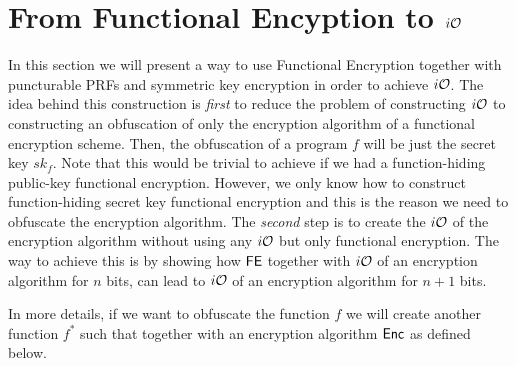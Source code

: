 \section{From Functional Encyption to $i\mathcal{O}$}

In this section we will present a way to use Functional Encryption together with puncturable PRFs and symmetric key encryption in order to achieve $i\mathcal{O}$. The idea behind this construction is \emph{first} to reduce the problem of constructing $i\mathcal{O}$ to constructing an obfuscation of only the encryption algorithm of a functional encryption scheme. Then, the obfuscation of a program $f$ will be just the secret key $sk_f$. Note that this would be trivial to achieve if we had a function-hiding public-key functional encryption. However, we only know how to construct function-hiding secret key functional encryption and this is the reason we need to obfuscate the encryption algorithm. The \emph{second} step is to create the $i\mathcal{O}$ of the encryption algorithm without using any $i\mathcal{O}$ but only functional encryption. The way to achieve this is by showing how $\mathsf{FE}$ together with $i\mathcal{O}$ of an encryption algorithm for $n$ bits, can lead to $i\mathcal{O}$ of an encryption algorithm for $n+1$ bits.

In more details, if we want to obfuscate the function $f$ we will create another function $f^*$ such that together with an encryption algorithm $\mathsf{Enc}$ as defined below.
\begin{figure}[h!]
\centering
{}
\end{figure}
\begin{figure}[h!]
\centering
{}
\end{figure}

